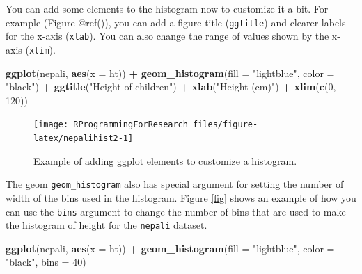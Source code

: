 \documentclass[]{book}
\makeatletter
\newenvironment{Shaded}{\begin{snugshade}}{\end{snugshade}}
\newcommand{\KeywordTok}[1]{\textcolor[rgb]{0.13,0.29,0.53}{\textbf{#1}}}
\newcommand{\DataTypeTok}[1]{\textcolor[rgb]{0.13,0.29,0.53}{#1}}
\newcommand{\DecValTok}[1]{\textcolor[rgb]{0.00,0.00,0.81}{#1}}
\newcommand{\StringTok}[1]{\textcolor[rgb]{0.31,0.60,0.02}{#1}}
\newcommand{\OperatorTok}[1]{\textcolor[rgb]{0.81,0.36,0.00}{\textbf{#1}}}
\newcommand{\NormalTok}[1]{#1}
\newenvironment{kframe}{%
\medskip{}
\setlength{\fboxsep}{.8em}
 \def\at@end@of@kframe{}%
 \ifinner\ifhmode%
  \def\at@end@of@kframe{\end{minipage}}%
  \begin{minipage}{\columnwidth}%
 \fi\fi%
 \def\FrameCommand##1{\hskip\@totalleftmargin \hskip-\fboxsep
 \colorbox{shadecolor}{##1}\hskip-\fboxsep
     \hskip-\linewidth \hskip-\@totalleftmargin \hskip\columnwidth}%
 \MakeFramed {\advance\hsize-\width
   \@totalleftmargin\z@ \linewidth\hsize
   \@setminipage}}%
 {\par\unskip\endMakeFramed%
 \at@end@of@kframe}
\renewenvironment{Shaded}{\begin{kframe}}{\end{kframe}}
\theoremstyle{definition}
\theoremstyle{definition}
\theoremstyle{definition}
\theoremstyle{remark}
\makeatother
\begin{document}
You can add some elements to the histogram now to customize it a bit.
For example (Figure @ref()), you can add a figure title
(\texttt{ggtitle}) and clearer labels for the x-axis (\texttt{xlab}).
You can also change the range of values shown by the x-axis
(\texttt{xlim}).

\begin{Shaded}
\begin{Highlighting}[]
\KeywordTok{ggplot}\NormalTok{(nepali, }\KeywordTok{aes}\NormalTok{(}\DataTypeTok{x =}\NormalTok{ ht)) }\OperatorTok{+}\StringTok{ }
\StringTok{  }\KeywordTok{geom_histogram}\NormalTok{(}\DataTypeTok{fill =} \StringTok{"lightblue"}\NormalTok{, }\DataTypeTok{color =} \StringTok{"black"}\NormalTok{) }\OperatorTok{+}\StringTok{ }
\StringTok{  }\KeywordTok{ggtitle}\NormalTok{(}\StringTok{"Height of children"}\NormalTok{) }\OperatorTok{+}\StringTok{ }
\StringTok{  }\KeywordTok{xlab}\NormalTok{(}\StringTok{"Height (cm)"}\NormalTok{) }\OperatorTok{+}\StringTok{ }\KeywordTok{xlim}\NormalTok{(}\KeywordTok{c}\NormalTok{(}\DecValTok{0}\NormalTok{, }\DecValTok{120}\NormalTok{))}
\end{Highlighting}
\end{Shaded}

\begin{figure}

{\centering \texttt{[image: RProgrammingForResearch\_files/figure-latex/nepalihist2-1]} 

}

\caption{Example of adding ggplot elements to customize a histogram.}\label{fig:nepalihist2}
\end{figure}

The geom \texttt{geom\_histogram} also has special argument for setting
the number of width of the bins used in the histogram. Figure \ref{fig}
shows an example of how you can use the \texttt{bins} argument to change
the number of bins that are used to make the histogram of height for the
\texttt{nepali} dataset.

\begin{Shaded}
\begin{Highlighting}[]
\KeywordTok{ggplot}\NormalTok{(nepali, }\KeywordTok{aes}\NormalTok{(}\DataTypeTok{x =}\NormalTok{ ht)) }\OperatorTok{+}\StringTok{ }
\StringTok{  }\KeywordTok{geom_histogram}\NormalTok{(}\DataTypeTok{fill =} \StringTok{"lightblue"}\NormalTok{, }\DataTypeTok{color =} \StringTok{"black"}\NormalTok{,}
                 \DataTypeTok{bins =} \DecValTok{40}\NormalTok{) }
\end{Highlighting}
\end{Shaded}
\end{document}
